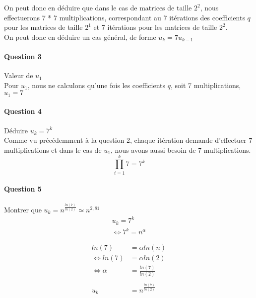 \documentclass[a4paper,10pt,margin=2in]{report}
\begin{document}
On peut donc en déduire que dans le cas de matrices de taille $2^2$, nous effectuerons 7 * 7 multiplications, correspondant au 7 itérations des coefficients $q$ pour les matrices de taille $2^1$ et 7 itérations pour les matrices de taille $2^2$.\\

On peut donc en déduire un cas général, de forme $u_k = 7u_{k-1}$

\paragraph{Question 3}
Valeur de $u_1$\\

Pour $u_1$, nous ne calculons qu'une fois les coefficients $q$, soit 7 multiplications, $u_1 = 7$

\paragraph{Question 4}
Déduire $u_k = 7^k$\\

Comme vu précédemment à la question 2, chaque itération demande d'effectuer 7 multiplications et dans le cas de $u_1$, nous avons aussi besoin de 7 multiplications.\\

\begin{equation*} 
\prod_{i=1}^k 7
= 7^k
\end{equation*}

\paragraph{Question 5}
Montrer que $u_k = n^{\frac{ln(7)}{ln(2)}} \simeq n^{2,81}$\\

\begin{align*}
u_k = 7^k\\
\iff 7^k = n ^ \alpha
\end{align*}

\begin{align*}
ln(7) &= \alpha ln(n)\\
\iff ln(7) &= \alpha ln(2)\\
\iff\alpha &= \frac{ln(7)}{ln(2)}\\
\\
u_k &= n^{\frac{ln(7)}{ln(2)}}
\end{align*}

\end{document}

